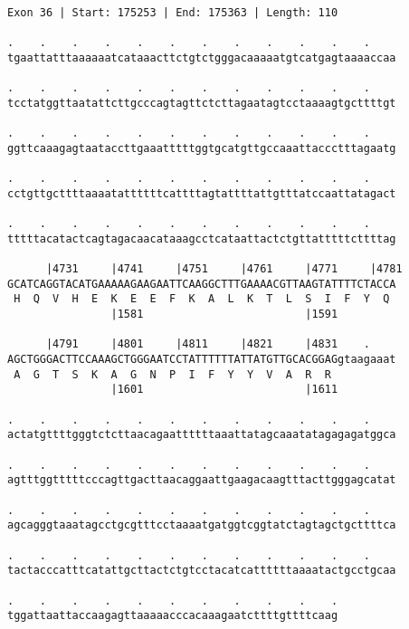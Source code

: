 \documentclass{article}
\begin{document}
\newpage
\begin{Verbatim}[fontfamily=courier]
Exon 36 | Start: 175253 | End: 175363 | Length: 110

.    .    .    .    .    .    .    .    .    .    .    .    
tgaattatttaaaaaatcataaacttctgtctgggacaaaaatgtcatgagtaaaaccaa

.    .    .    .    .    .    .    .    .    .    .    .    
tcctatggttaatattcttgcccagtagttctcttagaatagtcctaaaagtgcttttgt

.    .    .    .    .    .    .    .    .    .    .    .    
ggttcaaagagtaataccttgaaatttttggtgcatgttgccaaattaccctttagaatg

.    .    .    .    .    .    .    .    .    .    .    .    
cctgttgcttttaaaatattttttcattttagtattttattgtttatccaattatagact

.    .    .    .    .    .    .    .    .    .    .    .    
tttttacatactcagtagacaacataaagcctcataattactctgttatttttcttttag

      |4731     |4741     |4751     |4761     |4771     |4781
GCATCAGGTACATGAAAAAGAAGAATTCAAGGCTTTGAAAACGTTAAGTATTTTCTACCA
 H  Q  V  H  E  K  E  E  F  K  A  L  K  T  L  S  I  F  Y  Q 
                |1581                         |1591         

      |4791     |4801     |4811     |4821     |4831    .    
AGCTGGGACTTCCAAAGCTGGGAATCCTATTTTTTATTATGTTGCACGGAGgtaagaaat
 A  G  T  S  K  A  G  N  P  I  F  Y  Y  V  A  R  R          
                |1601                         |1611         

.    .    .    .    .    .    .    .    .    .    .    .    
actatgttttgggtctcttaacagaattttttaaattatagcaaatatagagagatggca

.    .    .    .    .    .    .    .    .    .    .    .    
agtttggtttttcccagttgacttaacaggaattgaagacaagtttacttgggagcatat

.    .    .    .    .    .    .    .    .    .    .    .    
agcagggtaaatagcctgcgtttcctaaaatgatggtcggtatctagtagctgcttttca

.    .    .    .    .    .    .    .    .    .    .    .    
tactacccatttcatattgcttactctgtcctacatcattttttaaaatactgcctgcaa

.    .    .    .    .    .    .    .    .    .    .
tggattaattaccaagagttaaaaacccacaaagaatcttttgttttcaag
\end{Verbatim}
\newpage
\end{document}

